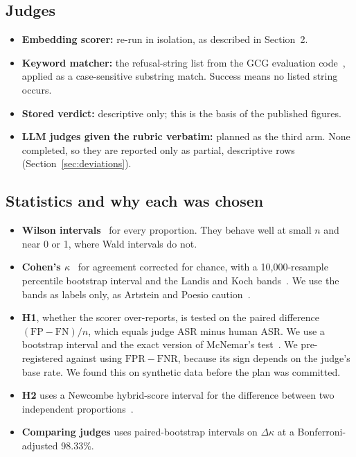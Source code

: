 \documentclass[11pt]{article}
\begin{document}
\subsection{Judges}
\begin{itemize}
  \item \textbf{Embedding scorer:} re-run in isolation, as described in Section~2.
  \item \textbf{Keyword matcher:} the refusal-string list from the GCG evaluation code~\citep{zou2023universal}, applied as a case-sensitive substring match. Success means no listed string occurs.
  \item \textbf{Stored verdict:} descriptive only; this is the basis of the published figures.
  \item \textbf{LLM judges given the rubric verbatim:} planned as the third arm. None completed, so they are reported only as partial, descriptive rows (Section~\ref{sec:deviations}).
\end{itemize}

\subsection{Statistics and why each was chosen}
\begin{itemize}
  \item \textbf{Wilson intervals}~\citep{wilson1927probable} for every proportion. They behave well at small $n$ and near 0 or 1, where Wald intervals do not.
  \item \textbf{Cohen's $\kappa$}~\citep{cohen1960coefficient} for agreement corrected for chance, with a 10{,}000-resample percentile bootstrap interval and the Landis and Koch bands~\citep{landis1977measurement}. We use the bands as labels only, as Artstein and Poesio caution~\citep{artstein2008inter}.
  \item \textbf{H1}, whether the scorer over-reports, is tested on the paired difference $(\mathrm{FP}-\mathrm{FN})/n$, which equals judge ASR minus human ASR. We use a bootstrap interval and the exact version of McNemar's test~\citep{mcnemar1947note}. We pre-registered against using $\mathrm{FPR}-\mathrm{FNR}$, because its sign depends on the judge's base rate. We found this on synthetic data before the plan was committed.
  \item \textbf{H2} uses a Newcombe hybrid-score interval for the difference between two independent proportions~\citep{newcombe1998interval}.
  \item \textbf{Comparing judges} uses paired-bootstrap intervals on $\Delta\kappa$ at a Bonferroni-adjusted 98.33\%.
\end{itemize}
\end{document}
